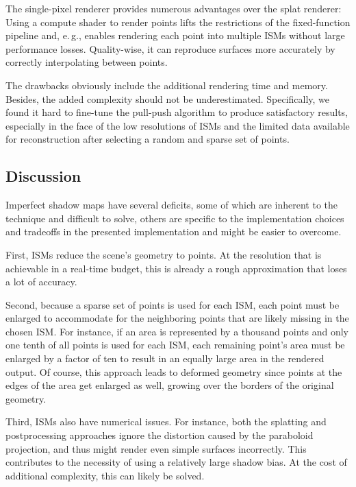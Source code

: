 The single-pixel renderer provides numerous advantages over the splat renderer: Using a compute shader to render points lifts the restrictions of the fixed-function pipeline and, e.\,g., enables rendering each point into multiple ISMs without large performance losses. Quality-wise, it can reproduce surfaces more accurately by correctly interpolating between points.

The drawbacks obviously include the additional rendering time and memory. Besides, the added complexity should not be underestimated. Specifically, we found it hard to fine-tune the pull-push algorithm to produce satisfactory results, especially in the face of the low resolutions of ISMs and the limited data available for reconstruction after selecting a random and sparse set of points.




\subsection{Discussion}
\label{sec:results:ism:discussion}

Imperfect shadow maps have several deficits, some of which are inherent to the technique and difficult to solve, others are specific to the implementation choices and tradeoffs in the presented implementation and might be easier to overcome.

First, ISMs reduce the scene's geometry to points. At the resolution that is achievable in a real-time budget, this is already a rough approximation that loses a lot of accuracy.

Second, because a sparse set of points is used for each ISM, each point must be enlarged to accommodate for the neighboring points that are likely missing in the chosen ISM. For instance, if an area is represented by a thousand points and only one tenth of all points is used for each ISM, each remaining point's area must be enlarged by a factor of ten to result in an equally large area in the rendered output. Of course, this approach leads to deformed geometry since points at the edges of the area get enlarged as well, growing over the borders of the original geometry.

Third, ISMs also have numerical issues. For instance, both the splatting and postprocessing approaches ignore the distortion caused by the paraboloid projection, and thus might render even simple surfaces incorrectly. This contributes to the necessity of using a relatively large shadow bias. At the cost of additional complexity, this can likely be solved.


